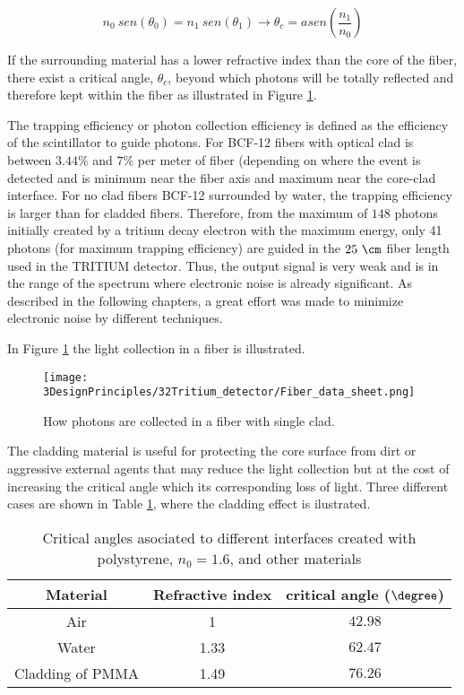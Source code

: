 \begin{equation}
n_0~sen(\theta_0) = n_1~sen(\theta_1) \longrightarrow \theta_c = asen\left(\frac{n_1}{n_0} \right)
\label{eq:Snell}
\end{equation}

If the surrounding material has a lower refractive index than the core of the fiber, there exist a critical angle, $\theta_c$, beyond which photons will be totally reflected and therefore kept within the fiber as illustrated in Figure \ref{fig:Fiber_physic}.

The trapping efficiency or photon collection efficiency is defined as the efficiency of the scintillator to guide photons. For BCF-12 fibers with optical clad is between $3.44\%$ and $7\%$ per meter of fiber (depending on where the event is detected and is minimum near the fiber axis  and maximum near the core-clad interface. For no clad fibers BCF-12 surrounded by water, the trapping efficiency is larger than for cladded fibers. Therefore, from the maximum of $148$ photons initially created by a tritium decay electron with the maximum energy, only 41 photons (for maximum trapping efficiency) are guided in the $25~\cm$ fiber length used in the TRITIUM detector. Thus, the output signal is very weak and is in the range of the spectrum where electronic noise is already significant. As described in the following chapters, a great effort was made to minimize electronic noise by different techniques.

In Figure \ref{fig:Fiber_physic} the light collection in a fiber is illustrated.

\begin{figure}[htbp]
\centering
\texttt{[image: 3DesignPrinciples/32Tritium\_detector/Fiber\_data\_sheet.png]}
\caption{How photons are collected in a fiber with single clad.\label{fig:Fiber_physic}~\cite{DataSheetBCF12Fiber}}
\end{figure}

The cladding material is useful for protecting the core surface from dirt or aggressive external agents that may reduce the light collection but at the cost of increasing the critical angle which its corresponding loss of light. Three different cases are shown in Table \ref{tab:CriticalAngles}, where the cladding effect is ilustrated.

\begin{table}[htbp]
\begin{center}
\begin{tabular}{|c|c|c|}
\hline
Material & Refractive index & critical angle ($\degree$) \\
\hline \hline \hline
Air & 1 & $42.98$ \\ \hline
Water & 1.33 & $62.47$ \\ \hline
Cladding of PMMA & 1.49 & $76.26$ \\ \hline
\end{tabular}
\caption{Critical angles asociated to different interfaces created with polystyrene, $n_0=1.6$, and other materials}
\label{tab:CriticalAngles}
\end{center}
\end{table}

